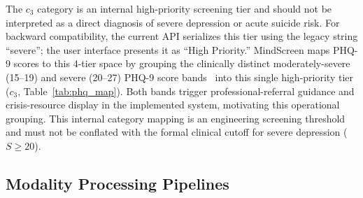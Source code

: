 \documentclass[10pt, conference, letterpaper]{IEEEtran}
\begin{document}
The $c_3$ category is an internal high-priority screening tier and should not be
interpreted as a direct diagnosis of severe depression or acute suicide risk.
For backward compatibility, the current API serializes this tier using the
legacy string ``severe''; the user interface presents it as ``High Priority.''
MindScreen maps PHQ-9 scores to this 4-tier space by grouping the clinically
distinct moderately-severe (15--19) and severe (20--27) PHQ-9 score bands~\cite{kroenke2001}
into this single high-priority tier ($c_3$, Table~\ref{tab:phq_map}).
Both bands trigger professional-referral guidance and crisis-resource display
in the implemented system, motivating this operational grouping.
This internal category mapping is an engineering screening threshold and
must not be conflated with the formal clinical cutoff for severe depression
($S \ge 20$).

\begin{table}[!t]
\caption{PHQ-9 Score to MindScreen Internal Screening Tier Mapping}
\label{tab:phq_map}
\centering
{}
\end{table}

\subsection{Modality Processing Pipelines}
\end{document}
